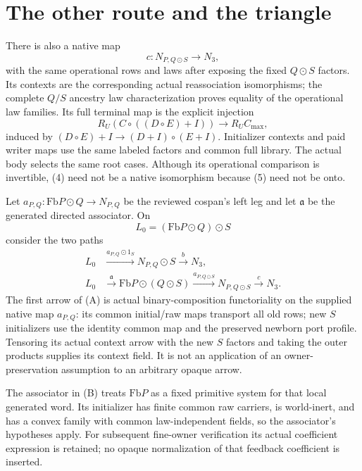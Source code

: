 \documentclass[11pt]{article}\usepackage{amsmath,amssymb,amsthm,geometry}\geometry{margin=1in}\newtheorem{theorem}{Theorem}
\begin{document}
\section{The other route and the triangle}
There is also a native map
\[
 c:N_{P,Q\odot S}\longrightarrow N_3,                \tag{4}
\]
with the same operational rows and laws after exposing the fixed $Q\odot S$ factors. Its contexts are the corresponding actual reassociation isomorphisms; the complete $Q/S$ ancestry law characterization proves equality of the operational law families. Its full terminal map is the explicit injection
\[
 R_U(C\circ((D\circ E)+I))\longrightarrow R_UC_{\max}, \tag{5}
\]
induced by $(D\circ E)+I\to(D+I)\circ(E+I)$. Initializer contexts and paid writer maps use the same labeled factors and common full library. The actual body selects the same root cases. Although its operational comparison is invertible, (4) need not be a native isomorphism because (5) need not be onto.

Let $a_{P,Q}:\mathrm{Fb}P\odot Q\to N_{P,Q}$ be the reviewed cospan's left leg and let $\mathfrak a$ be the generated directed associator. On
\[
                         L_0=(\mathrm{Fb}P\odot Q)\odot S
\]
consider the two paths
\[
\begin{split}
 L_0&\xrightarrow{a_{P,Q}\odot1_S}N_{P,Q}\odot S\xrightarrow b N_3,\tag{A}\\
 L_0&\xrightarrow{\mathfrak a}\mathrm{Fb}P\odot(Q\odot S)
       \xrightarrow{a_{P,Q\odot S}}N_{P,Q\odot S}\xrightarrow c N_3.\tag{B}
\end{split}
\]
The first arrow of (A) is actual binary-composition functoriality on the supplied native map $a_{P,Q}$: its common initial/raw maps transport all old rows; new $S$ initializers use the identity common map and the preserved newborn port profile. Tensoring its actual context arrow with the new $S$ factors and taking the outer products supplies its context field. It is not an application of an owner-preservation assumption to an arbitrary opaque arrow.

The associator in (B) treats $\mathrm{Fb}P$ as a fixed primitive system for that local generated word. Its initializer has finite common raw carriers, is world-inert, and has a convex family with common law-independent fields, so the associator's hypotheses apply. For subsequent fine-owner verification its actual coefficient expression is retained; no opaque normalization of that feedback coefficient is inserted.
\end{document}
